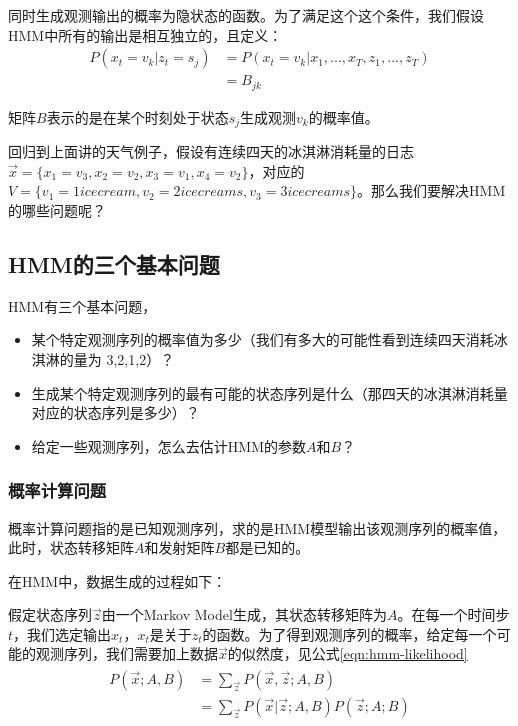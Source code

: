 同时生成观测输出的概率为隐状态的函数。为了满足这个这个条件，我们假设HMM中所有的输出是相互独立的，且定义：
\begin{align}
   P(x_t=v_k|z_{t}=s_{j}) &= P(x_t=v_k|x_1,...,x_T,z_1,...,z_T) \\
                          &= B_{jk}
\end{align}

矩阵$B$表示的是在某个时刻处于状态$s_j$生成观测$v_k$的概率值。

回归到上面讲的天气例子，假设有连续四天的冰淇淋消耗量的日志$\vec{x}=\{x_1=v_3, x_2=v_2, x_3=v_1, x_4=v_2\}$，对应的$V=\{v_1=1 ice cream, v_2=2 ice creams, v_3=3 ice creams\}$。那么我们要解决HMM的哪些问题呢？

\subsection{HMM的三个基本问题}
HMM有三个基本问题，
\begin{itemize}
  \item 某个特定观测序列的概率值为多少（我们有多大的可能性看到连续四天消耗冰淇淋的量为 3,2,1,2）？
  \item 生成某个特定观测序列的最有可能的状态序列是什么（那四天的冰淇淋消耗量对应的状态序列是多少）？
  \item 给定一些观测序列，怎么去估计HMM的参数$A$和$B$？
\end{itemize}

\subsubsection{概率计算问题}
概率计算问题指的是已知观测序列，求的是HMM模型输出该观测序列的概率值，此时，状态转移矩阵$A$和发射矩阵$B$都是已知的。

在HMM中，数据生成的过程如下：

假定状态序列$\vec{z}$由一个Markov Model生成，其状态转移矩阵为$A$。在每一个时间步$t$，我们选定输出$x_t$，$x_t$是关于$z_t$的函数。为了得到观测序列的概率，给定每一个可能的观测序列，我们需要加上数据$\vec{x}$的似然度，见公式\ref{eqn:hmm-likelihood}
\begin{align}
\label{eqn:hmm-likelihood}
\begin{split}
  P(\vec{x};A,B) &= \sum_{\vec{z}} P(\vec{x},\vec{z};A, B) \\
                 &= \sum_{\vec{z}} P(\vec{x}|\vec{z};A,B) P(\vec{z};A;B)
\end{split}
\end{align}

